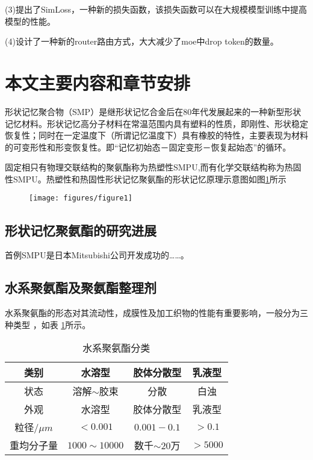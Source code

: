 (3)提出了SimLoss，一种新的损失函数，该损失函数可以在大规模模型训练中提高模型的性能。

(4)设计了一种新的router路由方式，大大减少了moe中drop token的数量。

\section{本文主要内容和章节安排}


形状记忆聚合物（SMP）是继形状记忆合金后在80年代发展起来的一种新型形状记忆材料\cite{Jiang2005Size}。形状记忆高分子材料在常温范围内具有塑料的性质，即刚性、形状稳定恢复性；同时在一定温度下（所谓记忆温度下）具有橡胶的特性，主要表现为材料的可变形性和形变恢复性。即“记忆初始态－固定变形－恢复起始态”的循环。

固定相只有物理交联结构的聚氨酯称为热塑性SMPU,而有化学交联结构称为热固性SMPU。热塑性和热固性形状记忆聚氨酯的形状记忆原理示意图如图\ref{fig:diagram}所示

\begin{figure}
	\centering
		\texttt{[image: figures/figure1]}
 \label{fig:diagram}
 
\end{figure}


\subsection{形状记忆聚氨酯的研究进展}
首例SMPU是日本Mitsubishi公司开发成功的……。

\subsection{水系聚氨酯及聚氨酯整理剂}

水系聚氨酯的形态对其流动性，成膜性及加工织物的性能有重要影响，一般分为三种类型\cite{Jiang2005Size} ，如表 \ref{tab:category}所示。

\begin{table}
  \centering
  \caption{水系聚氨酯分类} \label{tab:category}
  \begin{tabular*}{0.9\textwidth}{@{\extracolsep{\fill}}cccc}
  \toprule
    类别			&水溶型		&胶体分散型		&乳液型 \\
  \midrule
    状态			&溶解$\sim$胶束	&分散		&白浊 \\
    外观			&水溶型		&胶体分散型		&乳液型 \\
    粒径$/\mu m$	&$<0.001$		&$0.001-0.1$		&$>0.1$ \\
    重均分子量	&$1000\sim 10000$	&数千$\sim 20万$ &$>5000$ \\
  \bottomrule
  \end{tabular*}
\end{table}

